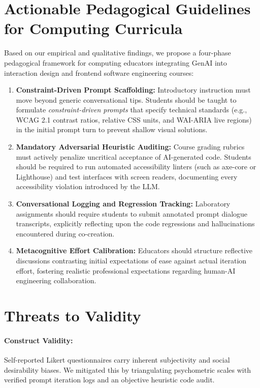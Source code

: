 \documentclass{cleiej}
\begin{document}
\section{Actionable Pedagogical Guidelines for Computing Curricula}
\label{sec:guidelines}

Based on our empirical and qualitative findings, we propose a four-phase pedagogical framework for computing educators integrating GenAI into interaction design and frontend software engineering courses:

\begin{enumerate}[label=\textbf{Phase \arabic*:}, leftmargin=*]
    \item \textbf{Constraint-Driven Prompt Scaffolding:} Introductory instruction must move beyond generic conversational tips. Students should be taught to formulate \textit{constraint-driven prompts} that specify technical standards (e.g., WCAG 2.1 contrast ratios, relative CSS units, and WAI-ARIA live regions) in the initial prompt turn to prevent shallow visual solutions.
    \item \textbf{Mandatory Adversarial Heuristic Auditing:} Course grading rubrics must actively penalize uncritical acceptance of AI-generated code. Students should be required to run automated accessibility linters (such as axe-core or Lighthouse) and test interfaces with screen readers, documenting every accessibility violation introduced by the LLM.
    \item \textbf{Conversational Logging and Regression Tracking:} Laboratory assignments should require students to submit annotated prompt dialogue transcripts, explicitly reflecting upon the code regressions and hallucinations encountered during co-creation.
    \item \textbf{Metacognitive Effort Calibration:} Educators should structure reflective discussions contrasting initial expectations of ease against actual iteration effort, fostering realistic professional expectations regarding human-AI engineering collaboration.
\end{enumerate}

\section{Threats to Validity}
\label{sec:threats}

\paragraph{Construct Validity:} 
Self-reported Likert questionnaires carry inherent subjectivity and social desirability biases. We mitigated this by triangulating psychometric scales with verified prompt iteration logs and an objective heuristic code audit.
\end{document}

